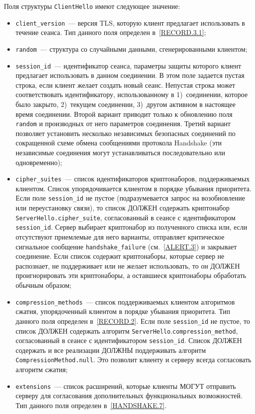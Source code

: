 Поля структуры \lstinline{ClientHello} имеют следующее значение:
\begin{itemize}
\item[--]
\lstinline{client_version}~--- версия TLS, которую клиент 
предлагает использовать в течение сеанса. Тип данного поля определен 
в~\ref{RECORD.3.1}; 

\item[--]
\lstinline{random}~--- структура со случайными данными, сгенерированными клиентом;

\item[--]
\lstinline{session_id}~--- идентификатор сеанса, параметры защиты которого клиент 
предлагает использовать в данном соединении. В этом поле задается пустая 
строка, если клиент желает создать новый сеанс. Непустая строка может 
соответствовать идентификатору, использованному в 1)~соединении, которое 
было закрыто, 2)~текущем соединении, 3)~другом активном в настоящее время 
соединении. Второй вариант приводит только к обновлению поля 
\lstinline{random} и производных от него параметров соединения. Третий 
вариант позволяет установить несколько независимых безопасных соединений 
по сокращенной схеме обмена сообщениями протокола Handshake (эти 
независимые соединения  могут устанавливаться последовательно или 
одновременно);

\item[--]
\lstinline{cipher_suites}~--- список идентификаторов криптонаборов, 
поддерживаемых клиентом. Список упорядочивается клиентом в порядке 
убывания приоритета. Если поле \lstinline{session_id} не пустое 
(подразумевается запрос на возобновление или переустановку связи), 
то список ДОЛЖЕН содержать криптонабор
\lstinline{ServerHello.cipher_suite}, согласованный в сеансе с
идентификатором \lstinline{session_id}. Сервер выбирает криптонабор из
полученного списка или, если отсутствуют приемлемые для него варианты,
отправляет критическое  сигнальное сообщение \lstinline{handshake_failure}
(см.~\ref{ALERT.3}) и закрывает соединение.  Если список содержит
криптонаборы, которые сервер не распознает, не поддерживает или не желает
использовать, то он ДОЛЖЕН проигнорировать эти криптонаборы, а оставшиеся
криптонаборы обработать обычным образом;

\item[--]
\lstinline{compression_methods}~--- список поддерживаемых клиентом 
алгоритмов сжатия, упорядоченный клиентом в порядке убывания приоритета. 
Тип данного поля определен в~\ref{RECORD.2}. Если поле 
\lstinline{session_id} не пустое, то список ДОЛЖЕН содержать 
алгоритм \lstinline{ServerHello}.\lstinline{compression_method}, 
согласованный в сеансе с идентификатором \lstinline{session_id}. 
Список ДОЛЖЕН содержать и все реализации ДОЛЖНЫ поддерживать алгоритм 
\lstinline{CompressionMethod.null}. Это позволит клиенту   
и серверу всегда согласовать алгоритм сжатия; 

\item[--]
\lstinline{extensions}~--- список расширений, которые клиенты МОГУТ 
отправить серверу для согласования дополнительных функциональных 
возможностей. Тип данного поля определен в~\ref{HANDSHAKE.7}. 
\end{itemize}

